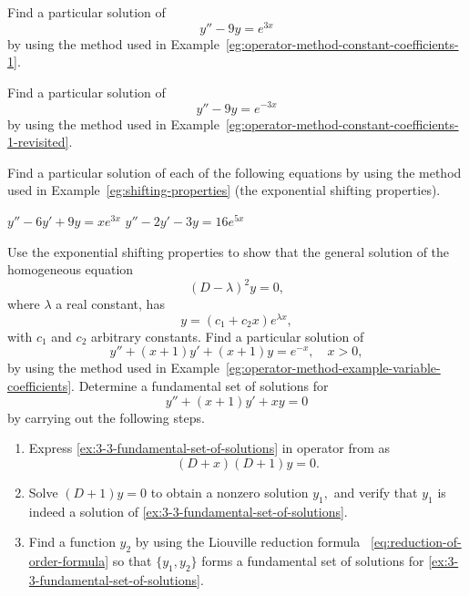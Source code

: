 \begin{Exercise}
\Question\label{3-3-11} Find a particular solution of 
\[y''-9y= e^{3x}\] by using the method used in Example~\ref{eg:operator-method-constant-coefficients-1}.

\Question\label{3-3-12}Find a particular solution of 
\[y''-9y= e^{-3x}\] by using the method used in Example~\ref{eg:operator-method-constant-coefficients-1-revisited}.

\Question\label{3-3-13} 
Find a particular solution of each of the following equations by using the method used in Example~\ref{eg:shifting-properties} (the exponential shifting properties).
\begin{tasks}
	\task \(y''-6y'+ 9y= xe^{3x}\)
	\task \(y''-2y'-3y = 16 e^{5x}\)
\end{tasks}
 \Question\label{3-3-14} Use the exponential shifting properties to show that the general solution of the homogeneous equation
 \[(D-\lambda)^2y = 0,\] where $\lambda$ a  real constant, has
 \[y = (c_1+c_2x)e^{\lambda x},\] with $c_1$ and $c_2$  arbitrary constants.
\Question\label{3-3-15} 
Find a particular solution of 
\[y''+(x+1)y'+(x+1)y= e^{-x}, \quad x>0,\] by using the method used in Example~\ref{eg:operator-method-example-variable-coefficients}.
\Question\label{3-3-16} Determine a fundamental set of solutions for
\begin{equation}\label{ex:3-3-fundamental-set-of-solutions}
	y''+(x+1)y'+xy=0 
\end{equation} by carrying out the following steps.
\begin{enumerate}[label=(\roman*),noitemsep]
	\item Express  \eqref{ex:3-3-fundamental-set-of-solutions}  in  operator from as\[(D+x)(D+1)y=0.\] 
	\item Solve $(D+1)y=0$  to obtain a nonzero solution $y_1,$ and verify that \(y_1\) is indeed a solution of \eqref{ex:3-3-fundamental-set-of-solutions}.
	\item   Find a  function \(y_2\) by using the Liouville  reduction formula ~\eqref{eq:reduction-of-order-formula} so that $\{y_1, y_2\}$ forms a fundamental set of solutions for \eqref{ex:3-3-fundamental-set-of-solutions}.
	

\end{enumerate}
\end{Exercise}
